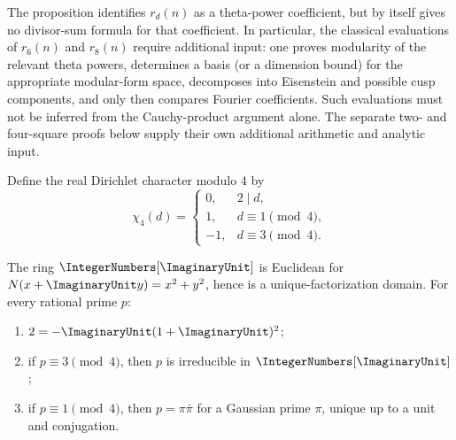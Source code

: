 \begin{warning}
The proposition identifies $r_d(n)$ as a theta-power coefficient, but by
itself gives no divisor-sum formula for that coefficient.  In particular, the
classical evaluations of $r_6(n)$ and $r_8(n)$ require additional input:
one proves modularity of the relevant theta powers, determines a basis (or a
dimension bound) for the appropriate modular-form space, decomposes into
Eisenstein and possible cusp components, and only then compares Fourier
coefficients.  Such evaluations must not be inferred from the Cauchy-product
argument alone.  The separate two- and four-square proofs below supply their
own additional arithmetic and analytic input.
\end{warning}

Define the real Dirichlet character modulo $4$ by
\[
 \chi_4(d)=
 \begin{cases}
  0,&2\mid d,\\
  1,&d\equiv1\pmod4,\\
 -1,&d\equiv3\pmod4.
 \end{cases}
\]

\begin{lemma}
\label{qg:lem-gaussian-ufd}
The ring $\IntegerNumbers[\ImaginaryUnit]$ is Euclidean for
$N(x+\ImaginaryUnit y)=x^2+y^2$, hence is a unique-factorization domain.
For every rational prime $p$:
\begin{enumerate}[label=\textup{(\roman*)}]
\item $2=-\ImaginaryUnit(1+\ImaginaryUnit)^2$;
\item if $p\equiv3\pmod4$, then $p$ is irreducible in
      $\IntegerNumbers[\ImaginaryUnit]$;
\item if $p\equiv1\pmod4$, then $p=\pi\bar\pi$ for a Gaussian prime
      $\pi$, unique up to a unit and conjugation.
\end{enumerate}
\end{lemma}

